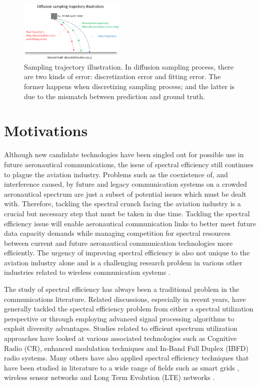 \begin{figure}[t] 
\centering
\includegraphics[width=0.45\textwidth]{figure/Error_discretization_vs_prediction.png}
\caption{Sampling trajectory illustration. In diffusion sampling process, there are two kinds of error: discretization error and fitting error. 
    The former happens when discretizing sampling process; and the latter is due to the mismatch between prediction and ground truth.}
\label{fig:error-d-vs-p}
\end{figure}

\section{Motivations}
Although new candidate technologies have been singled out for possible use in future aeronautical communications, the issue of spectral efficiency still continues to plague the aviation industry. Problems such as the coexistence of, and interference caused, by future and legacy communication systems on a crowded aeronautical spectrum are just a subset of potential issues which must be dealt with. Therefore, tackling the spectral crunch facing the aviation industry is a crucial but necessary step that must be taken in due time. Tackling the spectral efficiency issue will enable aeronautical communication links to better meet future data capacity demands while managing competition for spectral resources between current and future aeronautical communication technologies more efficiently. The urgency of improving spectral efficiency is also not unique to the aviation industry alone and is a challenging research problem in various other industries related to wireless communication systems \cite{dai2015non}. 

The study of spectral efficiency has always been a traditional problem in the communications literature. Related discussions, especially in recent years, have generally tackled the spectral efficiency problem from either a spectral utilization perspective or through employing advanced signal processing algorithms to exploit diversity advantages. Studies related to efficient spectrum utilization approaches have looked at various associated technologies such as Cognitive Radio (CR), enhanced modulation techniques and In-Band Full Duplex (IBFD) radio systems. Many others have also applied spectral efficiency techniques that have been studied in literature to a wide range of fields such as smart grids \cite{kouhdaragh2013cognitive}, wireless sensor networks \cite{he2014cr} and Long Term Evolution (LTE) networks \cite{zulhasnine2010efficient}. 

